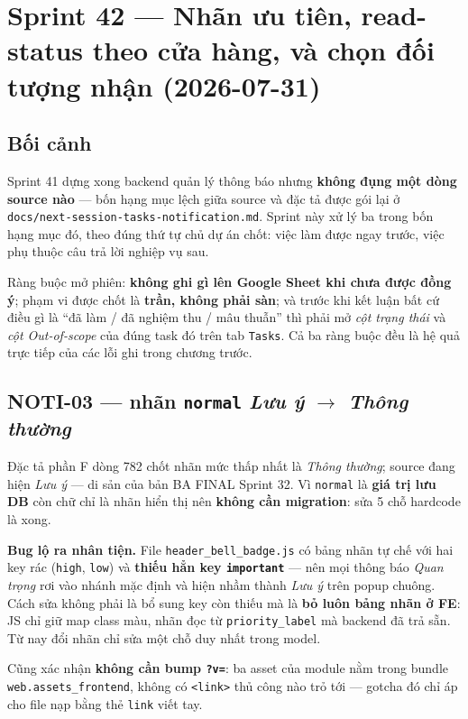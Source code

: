 \chapter{Sprint 42 --- Nhãn ưu tiên, read-status theo cửa hàng, và chọn đối tượng nhận (2026-07-31)}

\section{Bối cảnh}

Sprint 41 dựng xong backend quản lý thông báo nhưng \textbf{không đụng một dòng source nào} --- bốn
hạng mục lệch giữa source và đặc tả được gói lại ở \texttt{docs/next-session-tasks-notification.md}.
Sprint này xử lý ba trong bốn hạng mục đó, theo đúng thứ tự chủ dự án chốt: việc làm được ngay
trước, việc phụ thuộc câu trả lời nghiệp vụ sau.

Ràng buộc mở phiên: \textbf{không ghi gì lên Google Sheet khi chưa được đồng ý}; phạm vi được chốt
là \textbf{trần, không phải sàn}; và trước khi kết luận bất cứ điều gì là ``đã làm / đã nghiệm thu /
mâu thuẫn'' thì phải mở \emph{cột trạng thái} và \emph{cột Out-of-scope} của đúng task đó trên tab
\texttt{Tasks}. Cả ba ràng buộc đều là hệ quả trực tiếp của các lỗi ghi trong chương trước.

\section{NOTI-03 --- nhãn \texttt{normal} \emph{Lưu ý} $\to$ \emph{Thông thường}}

Đặc tả phần F dòng 782 chốt nhãn mức thấp nhất là \emph{Thông thường}; source đang hiện \emph{Lưu ý}
--- di sản của bản BA FINAL Sprint 32. Vì \texttt{normal} là \textbf{giá trị lưu DB} còn chữ chỉ là
nhãn hiển thị nên \textbf{không cần migration}: sửa 5 chỗ hardcode là xong.

\textbf{Bug lộ ra nhân tiện.} File \texttt{header\_bell\_badge.js} có bảng nhãn tự chế với hai key
rác (\texttt{high}, \texttt{low}) và \textbf{thiếu hẳn key \texttt{important}} --- nên mọi thông báo
\emph{Quan trọng} rơi vào nhánh mặc định và hiện nhầm thành \emph{Lưu ý} trên popup chuông. Cách sửa
không phải là bổ sung key còn thiếu mà là \textbf{bỏ luôn bảng nhãn ở FE}: JS chỉ giữ map class màu,
nhãn đọc từ \texttt{priority\_label} mà backend đã trả sẵn. Từ nay đổi nhãn chỉ sửa một chỗ duy nhất
trong model.

Cũng xác nhận \textbf{không cần bump \texttt{?v=}}: ba asset của module nằm trong bundle
\texttt{web.assets\_frontend}, không có \texttt{<link>} thủ công nào trỏ tới --- gotcha đó chỉ áp cho
file nạp bằng thẻ \texttt{link} viết tay.


